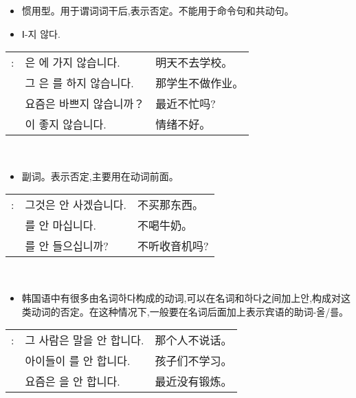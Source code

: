 \begin{grammar}
	\begin{grammarsect}[\kr -지 않다]
		\begin{itemize}
			\item 惯用型。用于谓词词干后,表示否定。不能用于命令句和共动句。
			\item {\color{gray}\kr  Ⅰ-지 않다.}
		\end{itemize}
		\begin{tabular}{lll}
			\kr \ruby{例}{예}: &\kr  \ruby{來日}{내일}은 \ruby{學校}{학교}에 가지 않습니다.   & 明天不去学校。  \\
			             &\kr  그 \ruby{學生}{학생}은 \ruby{宿題}{숙제}를 하지 않습니다. & 那学生不做作业。 \\
			             &\kr  요즘은 바쁘지 않습니까？                            & 最近不忙吗?   \\
			             &\kr  \ruby{氣分}{기분}이 좋지 않습니다.                  & 情绪不好。    \\
		\end{tabular}\\
	\end{grammarsect}
	\begin{grammarsect}[\kr 안]
		\begin{itemize}
			\item 副词。表示否定,主要用在动词前面。
		\end{itemize}
		\begin{tabular}{lll}
			\kr \ruby{例}{예}: &\kr  그것은 안 사겠습니다.                & 不买那东西。  \\
			             & \kr \ruby{牛乳}{우유}를 안 마십니다.      & 不喝牛奶。   \\
			             & \kr \ruby{라디오}{radio}를 안 들으십니까? & 不听收音机吗? \\
		\end{tabular}\\
	\end{grammarsect}
	\begin{itemize}
		\item 韩国语中有很多由名词{\kr 하다}构成的动词,可以在名词和{\kr 하다}之间加上{\kr 안},构成对这类动词的否定。在这种情况下,一般要在名词后面加上表示宾语的助词{\kr -올/를}。
	\end{itemize}
	\begin{tabular}{lll}
		\kr \ruby{例}{예}: & \kr 그 사람은 말을 안 합니다.             & 那个人不说话。 \\
		              & \kr 아이들이 \ruby{工夫}{공부}를 안 합니다.  & 孩子们不学习。 \\
		              & \kr 요즘은 \ruby{運動}{운동}을 안 합니다. & 最近没有锻炼。 \\
	\end{tabular}\\
\end{grammar}
